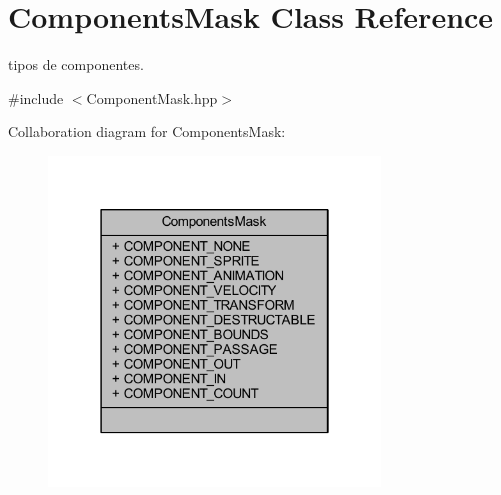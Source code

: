 \hypertarget{class_components_mask}{\section{Components\+Mask Class Reference}
\label{class_components_mask}
}


tipos de componentes.  




{\ttfamily \#include $<$Component\+Mask.\+hpp$>$}



Collaboration diagram for Components\+Mask\+:
\nopagebreak
\begin{figure}[H]
\begin{center}
\leavevmode
\includegraphics[width=250pt]{db/dea/class_components_mask__coll__graph}
\end{center}
\end{figure}
